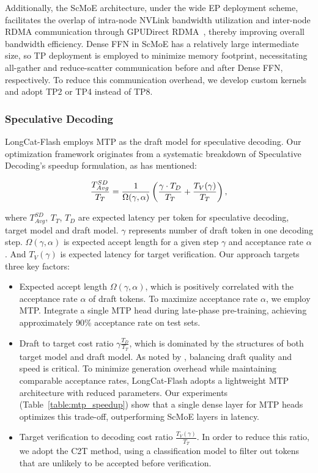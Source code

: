 \documentclass{article}
\newcommand{\longcat}{LongCat-Flash\xspace}
\begin{document}
Additionally, the ScMoE architecture, under the wide EP deployment scheme, facilitates the overlap of intra-node NVLink bandwidth utilization and inter-node RDMA communication through GPUDirect RDMA~\citep{choquette2022nvidia}, thereby improving overall bandwidth efficiency. Dense FFN in ScMoE has a relatively large intermediate size, so TP deployment is employed to minimize memory footprint, necessitating all-gather and reduce-scatter communication before and after Dense FFN, respectively. To reduce this communication overhead, we develop custom kernels and adopt TP2 or TP4 instead of TP8. 

\subsubsection{Speculative Decoding}


\longcat employs MTP as the draft model for speculative decoding. Our optimization framework originates from a systematic breakdown of Speculative Decoding's speedup formulation, as \citet{sadhukhan2025magicdecbreakinglatencythroughputtradeoff} has mentioned:

\begin{equation}
\frac{T^{SD}_{Avg}}{T_T} = \frac{1}{\Omega(\gamma, \alpha)} \left(\frac{\gamma \cdot T_D}{T_T} + \frac{T_V(\gamma)}{T_T}\right), \notag
\label{eq:spec_formula}
\end{equation}

where $T^{SD}_{Avg}$, $T_T$, $T_D$ are expected latency per token for speculative decoding, target model and draft model. $\gamma$ represents number of draft token in one decoding step. $\Omega(\gamma, \alpha)$ is expected accept length for a given step $\gamma$ and acceptance rate $\alpha$. And $T_V(\gamma)$ is expected latency for target verification. Our approach targets three key factors:

\begin{itemize}
\item Expected accept length $\Omega(\gamma, \alpha)$, which is positively correlated with the acceptance rate $\alpha$ of draft tokens. To maximize acceptance rate $\alpha$, we employ MTP. Integrate a single MTP head during late-phase pre-training, achieving approximately 90\% acceptance rate on test sets.
\item  Draft to target cost ratio $\gamma\frac{T_D}{T_T}$, which is dominated by the structures of both target model and draft model. As noted by \citet{liu2024speculativedecodingearlyexitingfaster}, balancing draft quality and speed is critical. To minimize generation overhead while maintaining comparable acceptance rates, \longcat adopts a lightweight MTP architecture with reduced parameters. Our experiments (Table~\ref{table:mtp_speedup}) show that a single dense layer for MTP heads optimizes this trade-off, outperforming ScMoE layers in latency.
\item Target verification to decoding cost ratio $\frac{T_V(\gamma)}{T_T}$. In order to reduce this ratio, we adopt the C2T \citep{huo2025c2tclassifierbasedtreeconstruction} method, using a classification model to filter out tokens that are unlikely to be accepted before verification.
\end{itemize}
\end{document}
